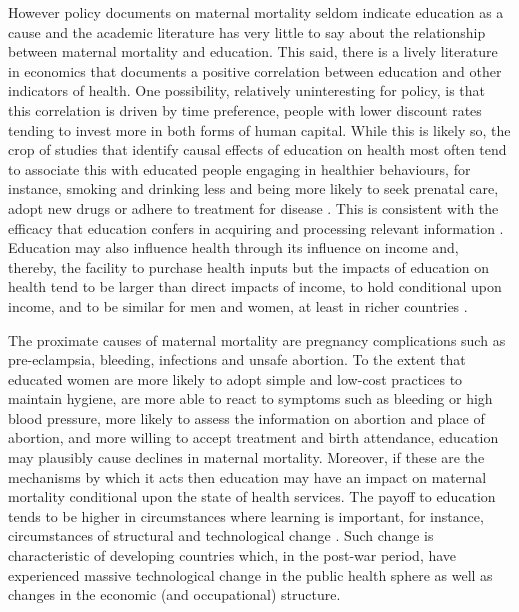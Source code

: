 \documentclass{article}[12pt,subeqn]
\begin{document}
\begin{spacing}{1.4}
However policy documents on maternal mortality seldom indicate education as a 
cause and the academic literature has very little to say about the relationship 
between maternal mortality and education. This said,
there is a lively literature in economics that documents a positive correlation 
between education and other indicators of health. One possibility, relatively 
uninteresting for policy, is that this correlation is driven by time preference, 
people with lower discount rates tending to invest more in both forms of human 
capital.  While this is likely so, the crop of studies that identify causal 
effects of education on health most often tend to associate this with educated 
people engaging in healthier behaviours, for instance, smoking and drinking
less and being more likely to seek prenatal care, adopt new drugs or adhere to 
treatment for disease \citep{GoldmanSmith2010, GoldmanLakdawalla2001, 
CurrieMoretti2003, LichtenburgLlerasMuney2005, CutlerLlerasMuney2010,
GliedLlerasMuney2010, JensenLlerasMuney2012}. This is consistent with the 
efficacy that education confers in acquiring and processing relevant information 
\citep{Rosenzweig1995, RosenzweigSchultz1989, CutlerLlerasMuney2010}. Education 
may also influence health through its influence on income and, thereby, the 
facility to purchase health inputs but the impacts of education on health tend to 
be larger than direct impacts of income, to hold conditional upon income, and to 
be similar for men and women, at least in richer countries \citep{LlerasMuney2005, 
CutlerLlerasMuney2010}.

The proximate causes of maternal mortality are pregnancy complications such as 
pre-eclampsia, bleeding, infections and unsafe abortion. To the extent that 
educated women are more likely to adopt simple and low-cost practices to maintain 
hygiene, are more able to react to symptoms such as bleeding or high blood
pressure, more likely to assess the information on abortion and place of abortion, 
and more willing to accept
treatment and birth attendance, education may plausibly cause declines in maternal 
mortality. Moreover, if these are the mechanisms by which it acts then education 
may have an impact on maternal mortality conditional upon the state of health 
services. The payoff to education tends to be higher in circumstances where 
learning is important, for instance, circumstances of structural and technological 
change \citep{FosterRosenzweig2004}. Such change is characteristic of developing 
countries which, in the post-war period, have experienced massive technological 
change in the public health sphere \citep{Cutleretal2006} as well as changes in 
the economic (and occupational) structure.


\end{spacing}
\end{document}
